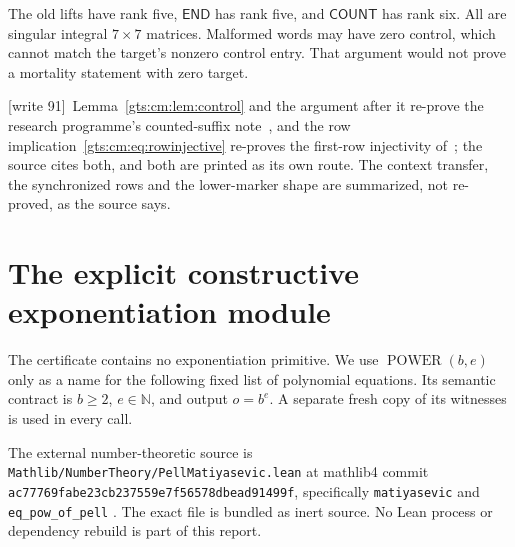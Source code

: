 \documentclass[11pt,letterpaper]{article}
\theoremstyle{definition}
\theoremstyle{remark}
\newcommand{\N}{\mathbb N}
\newcommand{\Pow}{\operatorname{POWER}}
\newcommand{\END}{\mathsf{END}}
\newcommand{\COUNT}{\mathsf{COUNT}}
\newcommand{\wtagd}{\textup{[write 91]}}
\begin{document}
The old lifts have rank five, $\END$ has rank five, and $\COUNT$ has rank six. All are singular integral $7\times7$ matrices. Malformed words may have zero control, which cannot match the target's nonzero control entry. That argument would not prove a mortality statement with zero target.

\wtagd\ Lemma~\ref{gts:cm:lem:control} and the argument after it re-prove the research programme's counted-suffix note~\cite{cm-counted}, and the row implication~\eqref{gts:cm:eq:rowinjective} re-proves the first-row injectivity of~\cite{cm-gamma}; the source cites both, and both are printed as its own route. The context transfer, the synchronized rows and the lower-marker shape are summarized, not re-proved, as the source says.

\section{The explicit constructive exponentiation module}
\label{gts:cm:sec:power}
The certificate contains no exponentiation primitive. We use $\Pow(b,e)$ only as a name for the following fixed list of polynomial equations. Its semantic contract is $b\ge2$, $e\in\N$, and output $o=b^e$. A separate fresh copy of its witnesses is used in every call.

The external number-theoretic source is \texttt{Mathlib/NumberTheory/PellMatiyasevic.lean} at mathlib4 commit \texttt{ac77769fabe23cb237559e7f56578dbead91499f}, specifically \texttt{matiyasevic} and \texttt{eq\_pow\_of\_pell} \cite{cm-pell}. The exact file is bundled as inert source. No Lean process or dependency rebuild is part of this report.
\end{document}
